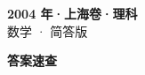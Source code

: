 \documentclass[zihao=-4, a4paper]{ctexart}
\begin{document}
\begin{center}
  {\Large\bfseries 2004 年·上海卷·理科}\\[4pt]
  {\large 数学 · 简答版}
\end{center}
\medskip
{}

\clearpage
{}
\begin{center}{\Large\bfseries 答案速查}\end{center}
\medskip

\end{document}
